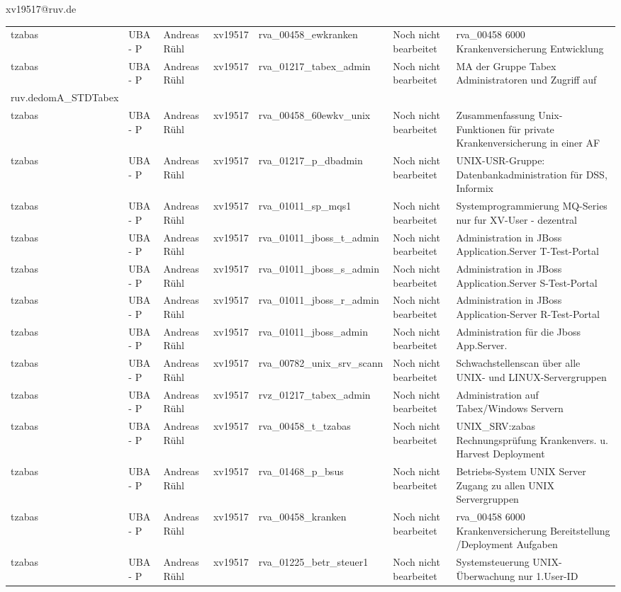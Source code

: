 \documentclass[a4paper,landscape,12pt]{letter}
\begin{document}
\begin{letter}{xv19517@ruv.de\hfill \break}
\begin{tiny}
\begin{longtable}{|p{35mm}|p{15mm}|p{25mm}|p{10mm}|p{40mm}|p{50mm}|p{50mm}|}
tzabas & UBA - P & Andreas Rühl & xv19517 & rva\_00458\_ewkranken & Noch nicht bearbeitet & rva\_00458 6000 Krankenversicherung Entwicklung \\
tzabas & UBA - P & Andreas Rühl & xv19517 & rva\_01217\_tabex\_admin & Noch nicht bearbeitet & MA der Gruppe Tabex Administratoren und Zugriff auf \\ruv.dedomA\_STDTabex \\
tzabas & UBA - P & Andreas Rühl & xv19517 & rva\_00458\_60ewkv\_unix & Noch nicht bearbeitet & Zusammenfassung Unix-Funktionen für private Krankenversicherung in einer AF \\
tzabas & UBA - P & Andreas Rühl & xv19517 & rva\_01217\_p\_dbadmin & Noch nicht bearbeitet & UNIX-USR-Gruppe: Datenbankadministration für  DSS, Informix \\
tzabas & UBA - P & Andreas Rühl & xv19517 & rva\_01011\_sp\_mqs1 & Noch nicht bearbeitet & Systemprogrammierung MQ-Series nur fur XV-User - dezentral \\
tzabas & UBA - P & Andreas Rühl & xv19517 & rva\_01011\_jboss\_t\_admin & Noch nicht bearbeitet & Administration in JBoss Application.Server T-Test-Portal \\
tzabas & UBA - P & Andreas Rühl & xv19517 & rva\_01011\_jboss\_s\_admin & Noch nicht bearbeitet & Administration in JBoss Application.Server S-Test-Portal \\
tzabas & UBA - P & Andreas Rühl & xv19517 & rva\_01011\_jboss\_r\_admin & Noch nicht bearbeitet & Administration in JBoss Application-Server R-Test-Portal \\
tzabas & UBA - P & Andreas Rühl & xv19517 & rva\_01011\_jboss\_admin & Noch nicht bearbeitet & Administration für die Jboss App.Server. \\
tzabas & UBA - P & Andreas Rühl & xv19517 & rva\_00782\_unix\_srv\_scann & Noch nicht bearbeitet & Schwachstellenscan über alle UNIX- und LINUX-Servergruppen \\
tzabas & UBA - P & Andreas Rühl & xv19517 & rvz\_01217\_tabex\_admin & Noch nicht bearbeitet & Administration auf Tabex/Windows Servern \\
tzabas & UBA - P & Andreas Rühl & xv19517 & rva\_00458\_t\_tzabas & Noch nicht bearbeitet & UNIX\_SRV:zabas Rechnungsprüfung Krankenvers. u. Harvest Deployment \\
tzabas & UBA - P & Andreas Rühl & xv19517 & rva\_01468\_p\_bsus & Noch nicht bearbeitet & Betriebs-System UNIX Server Zugang zu allen UNIX Servergruppen \\
tzabas & UBA - P & Andreas Rühl & xv19517 & rva\_00458\_kranken & Noch nicht bearbeitet & rva\_00458 6000 Krankenversicherung Bereitstellung /Deployment Aufgaben \\
tzabas & UBA - P & Andreas Rühl & xv19517 & rva\_01225\_betr\_steuer1 & Noch nicht bearbeitet & Systemsteuerung UNIX-Überwachung nur 1.User-ID \\


\end{longtable}
\end{tiny}
\end{letter}
\end{document}
